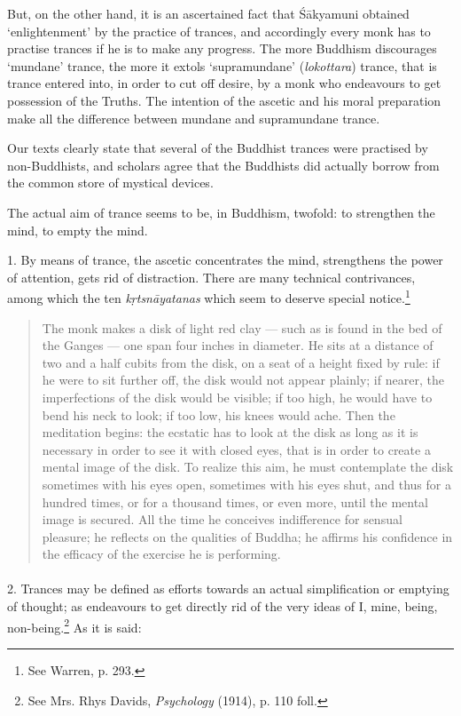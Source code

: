 \documentclass[a4paper, 11pt, oneside, english]{article}
\begin{document}
But, on the other hand, it is an ascertained fact that Śākyamuni obtained `enlightenment' by the practice of trances, and accordingly every monk has to practise trances if he is to make any progress. The more Buddhism discourages `mundane' trance, the more it extols `supramundane' (\emph{lokottara}) trance, that is trance entered into, in order to cut off desire, by a monk who endeavours to get possession of the Truths. The intention of the ascetic and his moral preparation make all the difference between mundane and supramundane trance.

Our texts clearly state that several of the Buddhist trances were practised by non-Buddhists, and scholars agree that the Buddhists did actually borrow from the common store of mystical devices.

The actual aim of trance seems to be, in Buddhism, twofold: to strengthen the mind, to empty the mind.

1. By means of trance, the ascetic concentrates the mind, strengthens the power of attention, gets rid of distraction. There are many technical contrivances, among which the ten \emph{kṛtsnāyatanas} which seem to deserve special notice.\footnote{See Warren, p. 293.}
\begin{quotation}
\small
The monk makes a disk of light red clay --- such as is found in the bed of the Ganges --- one span four inches in diameter. He sits at a distance of two and a half cubits from the disk, on a seat of a height fixed by rule: if he were to sit further off, the disk would not appear plainly; if nearer, the imperfections of the disk would be visible; if too high, he would have to bend his neck to look; if too low, his knees would ache. Then the meditation begins: the ecstatic has to look at the disk as long as it is necessary in order to see it with closed eyes, that is in order to create a mental image of the disk. To realize this aim, he must contemplate the disk sometimes with his eyes open, sometimes with his eyes shut, and thus for a hundred times, or for a thousand times, or even more, until the mental image is secured. All the time he conceives indifference for sensual pleasure; he reflects on the qualities of Buddha; he affirms his confidence in the efficacy of the exercise he is performing.
\end{quotation}
\paragraph{}
2. Trances may be defined as efforts towards an actual simplification or emptying of thought; as endeavours to get directly rid of the very ideas of I, mine, being, non-being.\footnote{See Mrs. Rhys Davids, \emph{Psychology} (1914), p. 110 foll.} As it is said:
\end{document}
